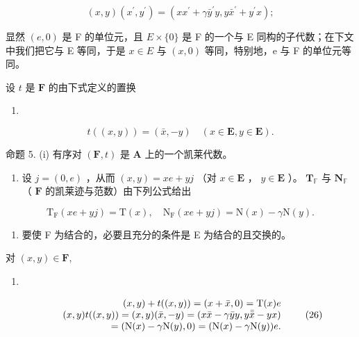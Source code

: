 \[
(x, y) (x ^ {\prime}, y ^ {\prime}) = (x x ^ {\prime} + \gamma \bar {y} ^ {\prime} y, y \bar {x} ^ {\prime} + y ^ {\prime} x);\tag{22}
\]

显然 \((e,0)\) 是 F 的单位元，且 \(E \times \{0\}\) 是 F 的一个与 E 同构的子代数；在下文中我们把它与 E 等同，于是 \(x \in E\) 与 \((x,0)\) 等同，特别地，e 与 F 的单位元等同。

设 \(t\) 是 \(\mathbf{F}\) 的由下式定义的置换

\begin{enumerate}
\def\labelenumi{(\arabic{enumi})}
\setcounter{enumi}{22}
\tightlist
\item
\end{enumerate}

\[
t ((x, y)) = (\bar {x}, - y) \quad (x \in \mathbf {E}, y \in \mathbf {E}).
\]

命题 5. (i) 有序对 \((\mathbf{F}, t)\) 是 \(\mathbf{A}\) 上的一个凯莱代数。

\begin{enumerate}
\def\labelenumi{(\roman{enumi})}
\setcounter{enumi}{1}
\tightlist
\item
  设 \(j = (0, e)\) ，从而 \((x, y) = xe + yj\) （对 \(x \in \mathbf{E}\) ， \(y \in \mathbf{E}\) ）。 \(\mathbf{T}_{\mathbb{F}}\) 与 \(\mathbf{N}_{\mathbb{F}}\) （ \(\mathbf{F}\) 的凯莱迹与范数）由下列公式给出
\end{enumerate}

\[
\mathrm{T} _ {\mathrm{F}} (x e + y j) = \mathrm{T} (x), \quad \mathrm{N} _ {\mathrm{F}} (x e + y j) = \mathrm{N} (x) - \gamma \mathrm{N} (y).\tag{24}
\]

\begin{enumerate}
\def\labelenumi{(\roman{enumi})}
\setcounter{enumi}{2}
\tightlist
\item
  要使 F 为结合的，必要且充分的条件是 E 为结合的且交换的。
\end{enumerate}

对 \((x,y)\in \mathbf{F},\)

\begin{enumerate}
\def\labelenumi{(\arabic{enumi})}
\setcounter{enumi}{24}
\tightlist
\item
\end{enumerate}

\[
\begin{array}{r l r} & & {(x, y) + t ((x, y)) = (x + \bar {x}, 0) = \mathrm{T} (x) e} \\ & & {(x, y) t ((x, y)) = (x, y) (\bar {x}, - y) = (x \bar {x} - \gamma \bar {y} y, y \bar {\bar {x}} - y x)} \\ & & {= (\mathrm{N} (x) - \gamma \mathrm{N} (y), 0) = (\mathrm{N} (x) - \gamma \mathrm{N} (y)) e.} \end{array}\tag{26}
\]


